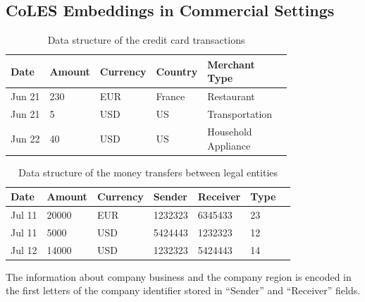 \documentclass[sigconf]{acmart}
\begin{document}
\subsection{CoLES Embeddings in Commercial Settings} \label{sec-commercial}

\begin{table}
    \centering
    \caption{Data structure of the credit card transactions}
    \begin{tabular}{llllll}
        \toprule
            \textbf{Date}
            & \textbf{Amount}
            & \textbf{Currency}
            & \textbf{Country}
            & \makecell{\textbf{Merchant} \\ \textbf{Type}}
            \\
        \midrule
            Jun 21 & 230 & EUR & France & Restaurant \\
            Jun 21 & 5 & USD & US & Transportation \\
            Jun 22 & 40 & USD & US & \makecell[l]{Household \\ Appliance} \\
        \bottomrule
    \end{tabular}
    \label{tab-tr-data}
\end{table}

\begin{table}
    \centering
    \caption{Data structure of the money transfers between legal entities}
    \begin{tabular}{lllllll}
        \toprule
            \textbf{Date}
            & \textbf{Amount}
            & \textbf{Currency}
            & \textbf{Sender}
            & \textbf{Receiver}
            & \textbf{Type}
            \\
        \midrule
            Jul 11 & 20000 & EUR & 1232323 & 6345433 & 23 \\
            Jul 11 & 5000 & USD & 5424443 & 1232323 & 12 \\
            Jul 12 & 14000 & USD & 1232323 & 5424443 & 14 \\
        \bottomrule
    \end{tabular}
    \small{
        The information about company business and the company region is encoded
        in the first letters of the company identifier stored in ``Sender'' and
        ``Receiver'' fields.
    }
\label{tab-org-tr-data}
\end{table}
\end{document}
